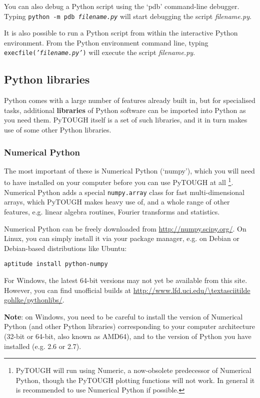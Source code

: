 You can also debug a Python script using the `pdb' command-line debugger.  Typing \texttt{python -m pdb \emph{filename.py}} will start debugging the script \emph{filename.py}.

It is also possible to run a Python script from within the interactive Python environment.  From the Python environment command line, typing \texttt{execfile(\emph{'filename.py'})} will execute the script \emph{filename.py}.

\subsection{Python libraries}
\label{pylibraries}

Python comes with a large number of features already built in, but for specialised tasks, additional \textbf{libraries} of Python software can be imported into Python as you need them.  PyTOUGH itself is a set of such libraries, and it in turn makes use of some other Python libraries.

\subsubsection{Numerical Python}

The most important of these is Numerical Python (`numpy'), which you will need to have installed on your computer before you can use PyTOUGH at all \footnote{PyTOUGH will run using Numeric, a now-obsolete predecessor of Numerical Python, though the PyTOUGH plotting functions will not work.  In general it is recommended to use Numerical Python if possible.}.  Numerical Python adds a special \texttt{numpy.array} class for fast multi-dimensional arrays, which PyTOUGH makes heavy use of, and a whole range of other features, e.g. linear algebra routines, Fourier transforms and statistics.

Numerical Python can be freely downloaded from \url{http://numpy.scipy.org/}.  On Linux, you can simply install it via your package manager, e.g. on Debian or Debian-based distributions like Ubuntu:

\texttt{aptitude install python-numpy}

For Windows, the latest 64-bit versions may not yet be available from this site.  However, you can find unofficial builds at \url{http://www.lfd.uci.edu/\textasciitilde gohlke/pythonlibs/}.

\textbf{Note}: on Windows, you need to be careful to install the version of Numerical Python (and other Python libraries) corresponding to your computer architecture (32-bit or 64-bit, also known as AMD64), and to the version of Python you have installed (e.g. 2.6 or 2.7).

